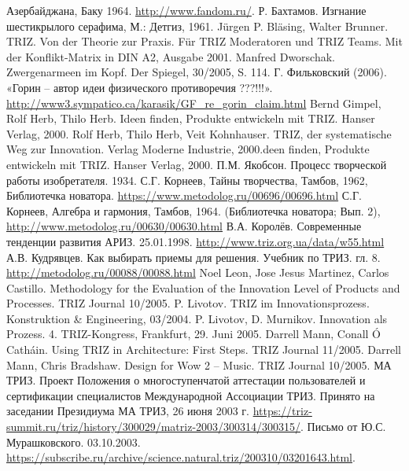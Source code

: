 \begin{thebibliography}{xxx}
  Азербайджана, Баку 1964.  \url{http://www.fandom.ru/}.
 Р. Бахтамов. Изгнание шестикрылого серафима, М.:
  Детгиз, 1961.  
 Jürgen P. Bläsing, Walter Brunner. TRIZ. Von der
  Theorie zur Praxis. Für TRIZ Moderatoren und TRIZ Teams. Mit der
  Konflikt-Matrix in DIN A2, Ausgabe 2001.
 Manfred Dworschak. Zwergenarmeen im Kopf. Der
  Spiegel, 30/2005, S. 114.
 Г. Фильковский (2006). «Горин -- автор идеи
  физического противоречия ???!!!».
  \url{http://www3.sympatico.ca/karasik/GF_re_gorin_claim.html}
 Bernd Gimpel, Rolf Herb, Thilo Herb. Ideen finden,
  Produkte entwickeln mit TRIZ. Hanser Verlag, 2000.
 Rolf Herb, Thilo Herb, Veit Kohnhauser. TRIZ, der
  systematische Weg zur Innovation. Verlag Moderne Industrie, 2000.deen finden,
  Produkte entwickeln mit TRIZ. Hanser Verlag, 2000.
  П.М. Якобсон. Процесс творческой работы изобретателя.
  1934. 
 С.Г. Корнеев, Тайны творчества, Тамбов, 1962,
  Библиотечка новатора.  \url{https://www.metodolog.ru/00696/00696.html} 
 С.Г. Корнеев, Алгебра и гармония, Тамбов, 1964.
  (Библиотечка новатора; Вып. 2),
  \url{http://www.metodolog.ru/00630/00630.html}
 В.А. Королёв. Современные тенденции развития АРИЗ.
  25.01.1998. \url{http://www.triz.org.ua/data/w55.html}
 А.В. Кудрявцев. Как выбирать приемы для решения.
  Учебник по ТРИЗ. гл. 8.  \url{http://metodolog.ru/00088/00088.html}
 Noel Leon, Jose Jesus Martinez, Carlos Castillo.
  Methodology for the Evaluation of the Innovation Level of Products and
  Processes. TRIZ Journal 10/2005.
 P. Livotov. TRIZ im Innovationsprozess. Konstruktion \&
  Engineering, 03/2004.
 P. Livotov, D. Murnikov. Innovation als Prozess. 
  4. TRIZ-Kongress, Frankfurt, 29. Juni 2005. 
 Darrell Mann, Conall Ó Catháin.  Using TRIZ in
  Architecture: First Steps. TRIZ Journal 11/2005.
 Darrell Mann, Chris Bradshaw. Design for Wow 2 – Music.
  TRIZ Journal 10/2005.
 МА ТРИЗ. Проект Положения о многоступенчатой аттестации
  пользователей и сертификации специалистов Международной Ассоциации ТРИЗ.
  Принято на заседании Президиума МА ТРИЗ, 26 июня 2003 г.
  \url{https://triz-summit.ru/triz/history/300029/matriz-2003/300314/300315/}.
 Письмо от Ю.С. Мурашковского. 03.10.2003.
  \url{https://subscribe.ru/archive/science.natural.triz/200310/03201643.html}.

\end{thebibliography}
